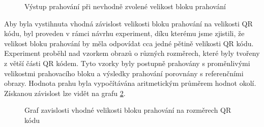 \begin{figure}[H]
  \begin{center}
    \caption{Výstup prahování při nevhodně zvolené velikost bloku prahování}
    \label{LocalThresholdingBadSizeOfThresholdBlock}
  \end{center}
\end{figure}

Aby byla vystihnuta vhodná závislost velikosti bloku prahování na velikosti QR
kódu, byl proveden v rámci návrhu experiment, díku kterému jsme zjistili, že
velikost bloku prahování by měla odpovídat cca jedné pětině velikosti QR kódu.
Experiment proběhl nad vzorkem obrazů o různých rozměrech, které byly tvořeny z
větší části QR kódem. Tyto vzorky byly postupně prahovány s proměnlivými
velikostmi prahovacího bloku a výsledky prahování porovnány s referenčními
obrazy. Hodnota prahu byla vypočítávána aritmetickým průměrem hodnot
okolí. Získanou závislost lze vidět na
grafu \ref{DependencyOfSizeOfThresholdBlockToQRCodeSizes}.

\begin{figure}[H]
  \begin{center}
    \caption{Graf zavislosti vhodné velikosti bloku prahování na rozměrech QR
    kódu}
    \label{DependencyOfSizeOfThresholdBlockToQRCodeSizes}
  \end{center}
\end{figure}

